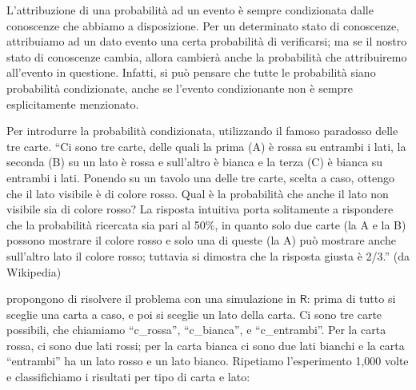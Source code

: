 \documentclass[
  11pt,
]{krantz}
\theoremstyle{definition}
\theoremstyle{definition}
\theoremstyle{definition}
\theoremstyle{definition}
\theoremstyle{remark}
\begin{document}
L'attribuzione di una probabilità ad un evento è sempre condizionata dalle conoscenze che abbiamo a disposizione. Per un determinato stato di conoscenze, attribuiamo ad un dato evento una certa probabilità di verificarsi; ma se il nostro stato di conoscenze cambia, allora cambierà anche la probabilità che attribuiremo all'evento in questione. Infatti, si può pensare che tutte le probabilità siano probabilità condizionate, anche se l'evento condizionante non è sempre esplicitamente menzionato.

Per introdurre la probabilità condizionata, \citet{albert2019probability} utilizzando il famoso paradosso delle tre carte. ``Ci sono tre carte, delle quali la prima (A) è rossa su entrambi i lati, la seconda (B) su un lato è rossa e sull'altro è bianca e la terza (C) è bianca su entrambi i lati. Ponendo su un tavolo una delle tre carte, scelta a caso, ottengo che il lato visibile è di colore rosso. Qual è la probabilità che anche il lato non visibile sia di colore rosso? La risposta intuitiva porta solitamente a rispondere che la probabilità ricercata sia pari al 50\%, in quanto solo due carte (la A e la B) possono mostrare il colore rosso e solo una di queste (la A) può mostrare anche sull'altro lato il colore rosso; tuttavia si dimostra che la risposta giusta è 2/3.'' (da Wikipedia)

\citet{albert2019probability} propongono di risolvere il problema con una simulazione in \(\textsf{R}\): prima di tutto si sceglie una carta a caso, e poi si sceglie un lato della carta. Ci sono tre carte possibili, che chiamiamo ``c\_rossa'', ``c\_bianca'', e ``c\_entrambi''. Per la carta rossa, ci sono due lati rossi; per la carta bianca ci sono due lati bianchi e la carta ``entrambi'' ha un lato rosso e un lato bianco. Ripetiamo l'esperimento 1,000 volte e classifichiamo i risultati per tipo di carta e lato:
\end{document}
